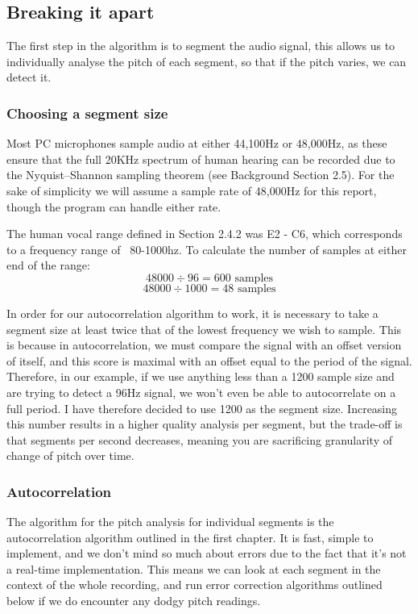 \subsection{Breaking it apart}
The first step in the algorithm is to segment the audio signal, this allows us to individually analyse the pitch of each segment, so that if the pitch varies, we can detect it.
\subsubsection{Choosing a segment size}
\par Most PC microphones sample audio at either 44,100Hz or 48,000Hz, as these ensure that the full 20KHz spectrum of human hearing can be recorded due to the Nyquist–Shannon sampling theorem (see Background Section 2.5). For the sake of simplicity we will assume a sample rate of 48,000Hz for this report, though the program can handle either rate.
\par The human vocal range defined in Section 2.4.2 was E2 - C6, which corresponds to a frequency range of ~80-1000hz\cite{scientificPitchTable}. To calculate the number of samples at either end of the range: 
 		 \[48000\div 96 = 600 \text{ samples}\] 
		 \[48000\div 1000 = 48 \text{ samples}\]
		
\par In order for our autocorrelation algorithm to work, it is  necessary to take a segment size at least twice that of the lowest frequency we wish to sample.
This is because in autocorrelation, we must compare the signal with an offset version of itself, and this score is maximal with an offset equal to the period of the signal. Therefore, in our example, if we use anything less than a 1200 sample size and are trying to detect a 96Hz signal, we won't even be able to autocorrelate on a full period.  I have therefore decided to use 1200 as the segment size. Increasing this number results in a higher quality analysis per segment, but the trade-off is that segments per second decreases, meaning you are sacrificing granularity of change of pitch over time.

\subsubsection{Autocorrelation}
The algorithm for the pitch analysis for individual segments is the autocorrelation algorithm outlined in the first chapter. It is fast, simple to implement, and we don't mind so much about errors due to the fact that it's not a real-time implementation. This means we can look at each segment in the context of the whole recording, and run error correction algorithms outlined below if we do encounter any dodgy pitch readings.

